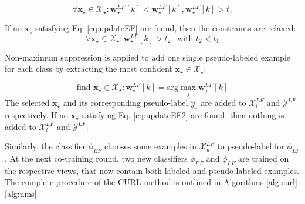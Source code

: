 \documentclass[journal,11pt]{IEEEtran}
\begin{document}
\begin{equation}
\forall \mathbf{x}_\star \in \mathcal{X}_\star: \mathbf{w}_\star^{\scriptscriptstyle EF}[k]<\mathbf{w}_\star^{\scriptscriptstyle LF}[k], \mathbf{w}_\star^{\scriptscriptstyle LF}[k]  > \! t_1
\label{eq:updateEF}
\end{equation}

If no $\mathbf{x}_\star$ satisfying Eq. \ref{eq:updateEF} are found, then the constraints are relaxed:
\begin{equation}
\forall \mathbf{x}_\star \in \mathcal{X}_\star: \mathbf{w}_\star^{\scriptscriptstyle LF}[k]  > \! t_2, \text{ with } t_2<t_1
\label{eq:updateEF2}
\end{equation}

Non-maximum suppression is applied to add one single pseudo-labeled example for each class by extracting the most confident $\mathbf{x}_\star \in \mathcal{X}_\star$:

\begin{equation}
\text{find } \mathbf{x}_\star  \in  \mathcal{X}_\star : \mathbf{w}_\star^{\scriptscriptstyle LF}[k]  = \displaystyle \text{arg} \! \max_{j} \mathbf{w}_j^{\scriptscriptstyle LF}[k] 
\label{eq:coso}
\end{equation}
The selected $\mathbf{x}_\star$ and its corresponding pseudo-label $\hat{y}_\star$ are added to $\mathcal{X}_l^{\scriptscriptstyle LF}$ and $\mathcal{Y}^{\scriptscriptstyle LF}$ respectively. If no $\mathbf{x}_\star$ satisfying Eq. \ref{eq:updateEF2} are found, then nothing is added to $\mathcal{X}_l^{\scriptscriptstyle LF}$ and $\mathcal{Y}^{\scriptscriptstyle LF}$.

Similarly, the classifier $\phi_{\scriptscriptstyle EF}$ chooses some examples in $\mathcal{X}_u^{\scriptscriptstyle LF}$ to pseudo-label for $\phi_{\scriptscriptstyle LF}$. 
At the next co-training round, two new classifiers $\phi_{\scriptscriptstyle EF}$ and $\phi_{\scriptscriptstyle LF}$ are trained on the respective views, that now contain both labeled and pseudo-labeled examples. 
The complete procedure of the CURL method is outlined in Algorithms \ref{alg:curl}-\ref{alg:nms}.
\end{document}
